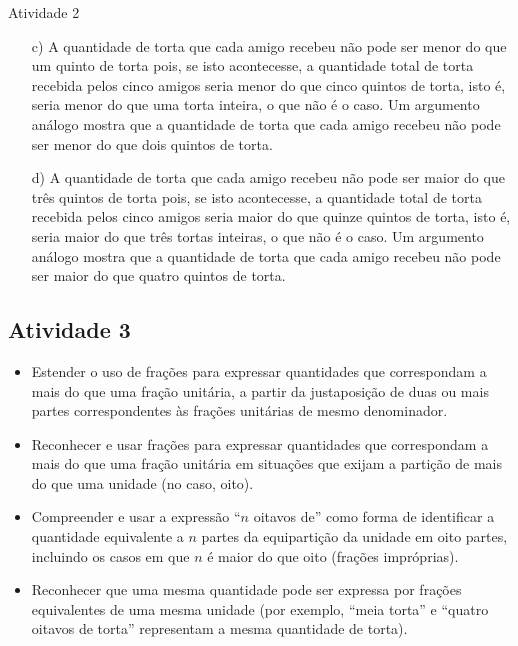 \begin{multicols}{2}
\begin{resposta*}{Atividade 2}
\begin{enumerate}[a)]
    \item[c)]     A quantidade de torta que cada amigo recebeu não pode ser menor do que um quinto de torta pois, se isto acontecesse, a quantidade total de torta recebida pelos cinco amigos seria menor do que cinco quintos de torta, isto é, seria menor do que uma torta inteira, o que não é o caso. Um argumento análogo mostra que a quantidade de torta que cada amigo recebeu não pode ser menor do que dois quintos de torta.
    \item[d)]       A quantidade de torta que cada amigo recebeu não pode ser maior do que três quintos de torta pois, se isto acontecesse, a quantidade total de torta recebida pelos cinco amigos seria maior do que quinze quintos de torta, isto é, seria maior do que três tortas inteiras, o que não é o caso. Um argumento análogo mostra que a quantidade de torta que cada amigo recebeu não pode ser maior do que quatro quintos de torta.
\end{enumerate} %


\end{resposta*}




\subsection{Atividade 3}

   \vspace{.1cm}

\begin{itemize} %
    \item       Estender o uso de frações para expressar quantidades que correspondam a mais do que uma fração unitária, a partir da justaposição de duas ou mais partes correspondentes às frações unitárias de mesmo denominador.
    \item       Reconhecer e usar frações para expressar quantidades que correspondam a mais do que uma fração unitária em situações que exijam a partição de mais do que uma unidade (no caso, oito).
    \item       Compreender e usar a expressão       ``$n$ oitavos de''     como forma de identificar a quantidade equivalente a       $n$ partes da equipartição da unidade em oito partes, incluindo os casos em que       $n$ é maior do que oito (frações impróprias).
    \item       Reconhecer que uma mesma quantidade pode ser expressa por frações equivalentes de uma mesma unidade (por exemplo,       ``meia torta''     e       ``quatro oitavos de torta''     representam a mesma quantidade de torta).
\end{itemize} %



\end{multicols}
